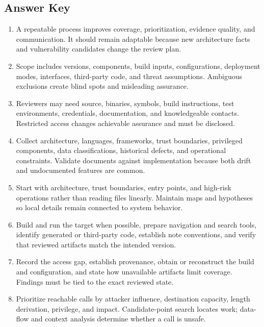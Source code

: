 \documentclass[11pt,letterpaper]{article}
\begin{document}
\subsection*{Answer Key}
\begin{enumerate}
\item A repeatable process improves coverage, prioritization, evidence quality, and communication. It should remain adaptable because new architecture facts and vulnerability candidates change the review plan.
\item Scope includes versions, components, build inputs, configurations, deployment modes, interfaces, third-party code, and threat assumptions. Ambiguous exclusions create blind spots and misleading assurance.
\item Reviewers may need source, binaries, symbols, build instructions, test environments, credentials, documentation, and knowledgeable contacts. Restricted access changes achievable assurance and must be disclosed.
\item Collect architecture, languages, frameworks, trust boundaries, privileged components, data classifications, historical defects, and operational constraints. Validate documents against implementation because both drift and undocumented features are common.
\item Start with architecture, trust boundaries, entry points, and high-risk operations rather than reading files linearly. Maintain maps and hypotheses so local details remain connected to system behavior.
\item Build and run the target when possible, prepare navigation and search tools, identify generated or third-party code, establish note conventions, and verify that reviewed artifacts match the intended version.
\item Record the access gap, establish provenance, obtain or reconstruct the build and configuration, and state how unavailable artifacts limit coverage. Findings must be tied to the exact reviewed state.
\item Prioritize reachable calls by attacker influence, destination capacity, length derivation, privilege, and impact. Candidate-point search locates work; data-flow and context analysis determine whether a call is unsafe.
\end{enumerate}
\end{document}
